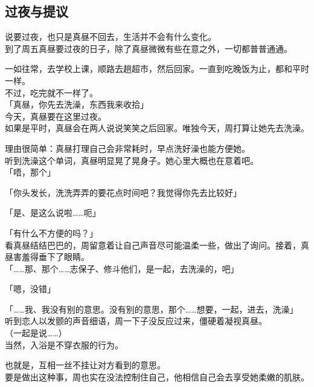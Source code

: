 \subsection{过夜与提议}

说要过夜，也只是真昼不回去，生活并不会有什么变化。\\

到了周五真昼要过夜的日子，除了真昼微微有些在意之外，一切都普普通通。

一如往常，去学校上课，顺路去趟超市，然后回家。一直到吃晚饭为止，都和平时一样。\\

不过，吃完就不一样了。\\

「真昼，你先去洗澡，东西我来收拾」\\

今天，真昼要在这里过夜。\\

如果是平时，真昼会在两人说说笑笑之后回家。唯独今天，周打算让她先去洗澡。

理由很简单：真昼打理自己会非常耗时，早点洗好澡也能方便她。\\

听到洗澡这个单词，真昼明显晃了晃身子。她心里大概也在意着吧。\\

「唔，那个」

「你头发长，洗洗弄弄的要花点时间吧？我觉得你先去比较好」

「是、是这么说啦……呃」

「有什么不方便的吗？」\\

看真昼结结巴巴的，周留意着让自己声音尽可能温柔一些，做出了询问。接着，真昼害羞得垂下了眼睛。\\

「……那、那个……志保子、修斗他们，是一起，去洗澡的，吧」

「嗯，没错」

「……我、我没有别的意思。没有别的意思，那个……想要，一起，进去，洗澡」\\

听到恋人以发颤的声音细语，周一下子没反应过来，僵硬着凝视真昼。\\

（一起是说……）\\

当然，入浴是不穿衣服的行为。

也就是，互相一丝不挂让对方看到的意思。\\

要是做出这种事，周也实在没法控制住自己，他相信自己会去享受她柔嫩的肌肤。\\

